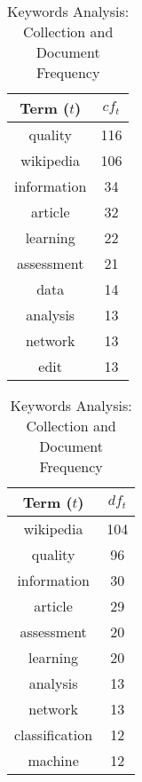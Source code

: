 \begin{table}[ht]
    \caption{Keywords Analysis: Collection and Document Frequency}
    \label{tab:keywords_analysis}
    \begin{minipage}{.325\textwidth}
        \centering
        \begin{tabular}{c c}
            \toprule
            Term ($t$) & $cf_t$ \\
            \midrule
            quality & 116 \\
            wikipedia & 106 \\
            information & 34 \\
            article & 32 \\
            learning & 22 \\
            assessment & 21 \\
            data & 14 \\
            analysis & 13 \\
            network & 13 \\
            edit & 13 \\
            \bottomrule
        \end{tabular}
    \end{minipage}
    \begin{minipage}{.325\textwidth}
        \centering
        \begin{tabular}{c c}
            \toprule
            Term ($t$) & $df_t$ \\
            \midrule
            wikipedia & 104 \\
            quality & 96 \\
            information & 30 \\
            article & 29 \\
            assessment & 20 \\
            learning & 20 \\
            analysis & 13 \\
            network & 13 \\
            classification & 12 \\
            machine & 12 \\
            \bottomrule
        \end{tabular}
    \end{minipage}
\end{table}
